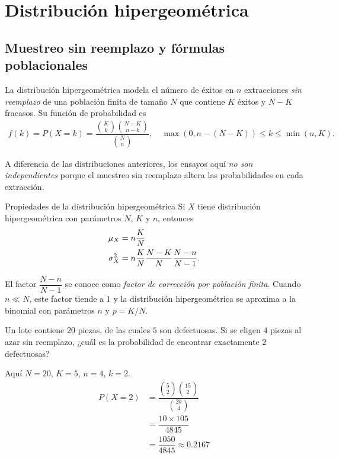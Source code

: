 \section{Distribución hipergeométrica}
\subsection{Muestreo sin reemplazo y fórmulas poblacionales}

La distribución hipergeométrica modela el número de éxitos en $n$ extracciones \emph{sin reemplazo} de una población finita de tamaño $N$ que contiene $K$ éxitos y $N-K$ fracasos. Su función de probabilidad es
\begin{align}
 \label{eq:2.10.11}
 f(k) = P(X=k) = \dfrac{\binom{K}{k}\binom{N-K}{n-k}}{\binom{N}{n}}, \quad \max(0, n-(N-K)) \leq k \leq \min(n, K).
\end{align}

A diferencia de las distribuciones anteriores, los ensayos aquí \emph{no son independientes} porque el muestreo sin reemplazo altera las probabilidades en cada extracción.

{Propiedades de la distribución hipergeométrica} Si $X$ tiene distribución hipergeométrica con parámetros $N$, $K$ y $n$, entonces
\begin{align}
 \mu_{X} &= n\dfrac{K}{N} \\
 \sigma_{X}^{2} &= n\dfrac{K}{N}\dfrac{N-K}{N}\dfrac{N-n}{N-1}.
\end{align}

El factor $\dfrac{N-n}{N-1}$ se conoce como \emph{factor de corrección por población finita}. Cuando $n \ll N$, este factor tiende a $1$ y la distribución hipergeométrica se aproxima a la binomial con parámetros $n$ y $p=K/N$.

\begin{ejemplo}
 \label{exmp:2.10.16}
 Un lote contiene $20$ piezas, de las cuales $5$ son defectuosas. Si se eligen $4$ piezas al azar sin reemplazo, ¿cuál es la probabilidad de encontrar exactamente $2$ defectuosas?
\end{ejemplo}

\begin{solucion}
	Aquí $N=20$, $K=5$, $n=4$, $k=2$.
	\begin{align}
		P(X=2) &= \dfrac{\binom{5}{2}\binom{15}{2}}{\binom{20}{4}} \\
		&= \dfrac{10 \times 105}{4845} \\
		&= \dfrac{1050}{4845} \approx 0.2167
	\end{align}
\end{solucion}

